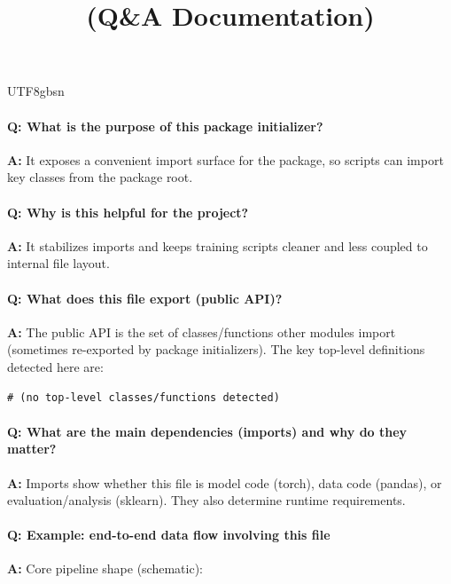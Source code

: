\documentclass[11pt]{article}
\title{\texttt{\detokenize{dataloader/__init__.py}} (Q\&A Documentation)}
\author{}
\date{}
\begin{document}
\begin{CJK*}{UTF8}{gbsn}
\maketitle

\paragraph{Q: What is the purpose of this package initializer?}
\textbf{A:} It exposes a convenient import surface for the package, so scripts can import key classes from the package root.

\paragraph{Q: Why is this helpful for the project?}
\textbf{A:} It stabilizes imports and keeps training scripts cleaner and less coupled to internal file layout.

\paragraph{Q: What does this file export (public API)?}
\textbf{A:} The public API is the set of classes/functions other modules import (sometimes re-exported by package initializers). The key top-level definitions detected here are:

\begin{Verbatim}[fontsize=\small]
# (no top-level classes/functions detected)
\end{Verbatim}

\paragraph{Q: What are the main dependencies (imports) and why do they matter?}
\textbf{A:} Imports show whether this file is model code (torch), data code (pandas), or evaluation/analysis (sklearn). They also determine runtime requirements.

\vspace{1mm}


\paragraph{Q: Example: end-to-end data flow involving this file}
\textbf{A:} Core pipeline shape (schematic):


\end{CJK*}
\end{document}
